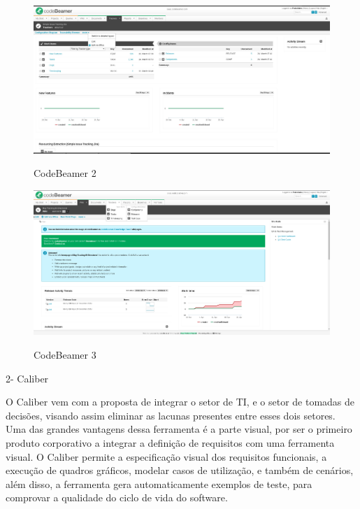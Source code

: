 \FloatBarrier
\begin{figure}[!htpd]
		\centering
		\includegraphics[scale=0.27]{figuras/Code01}
		\label{img:SAF}
		\caption{CodeBeamer 2}
\end{figure}
\FloatBarrier


\FloatBarrier
\begin{figure}[!htpd]
		\centering
		\includegraphics[scale=0.2]{figuras/Code02}
		\label{img:SAF}
		\caption{CodeBeamer 3}
\end{figure}
\FloatBarrier

2- Caliber

O Caliber vem com a proposta de integrar o setor de TI, e o setor de tomadas de decisões, visando assim eliminar as lacunas presentes entre esses dois setores. Uma das grandes vantagens dessa ferramenta é a parte visual, por ser o primeiro produto corporativo a integrar a definição de requisitos com uma ferramenta visual. O Caliber permite a especificação visual dos requisitos funcionais, a execução de quadros gráficos, modelar casos de utilização, e também de cenários, além disso, a ferramenta gera automaticamente exemplos de teste, para comprovar a qualidade do ciclo de vida do software.


